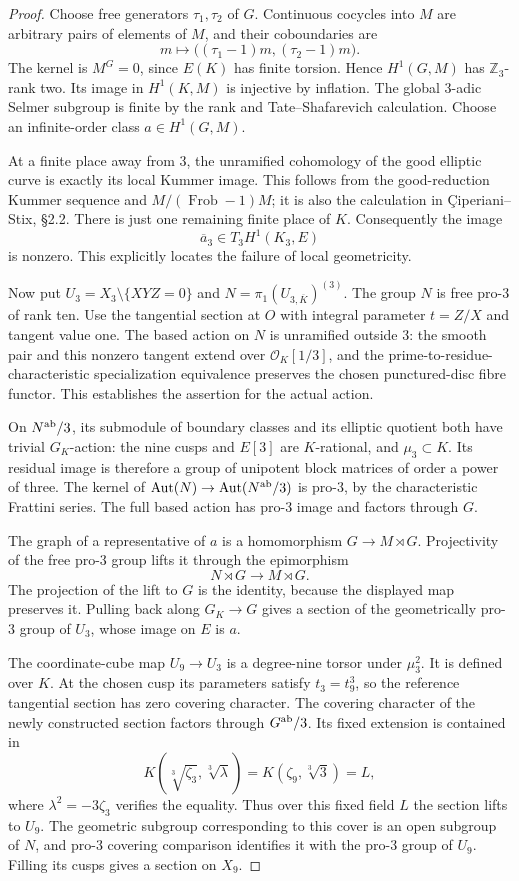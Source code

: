 \begin{proof}
Choose free generators $\tau_1,\tau_2$ of
$G$. Continuous cocycles into $M$ are
arbitrary pairs of elements of $M$,
and their coboundaries are
\[
 m\longmapsto
 \bigl((\tau_1-1)m,(\tau_2-1)m\bigr).
\]
The kernel is $M^G=0$, since $E(K)$ has
finite torsion. Hence $H^1(G,M)$ has
$\mathbb Z_3$-rank two. Its image in
$H^1(K,M)$ is injective by inflation.
The global $3$-adic Selmer subgroup is
finite by the rank and Tate--Shafarevich
calculation. Choose an infinite-order
class $a\in H^1(G,M)$.

At a finite place away from $3$, the
unramified cohomology of the good elliptic
curve is exactly its local Kummer image.
This follows from the good-reduction
Kummer sequence and
$M/(\operatorname{Frob}-1)M$; it is also
the calculation in
\c{C}iperiani--Stix, \S2.2.
There is just one remaining finite place
of $K$. Consequently the image
\[
 \overline a_3\in T_3H^1(K_3,E)
\]
is nonzero. This explicitly locates the
failure of local geometricity.

Now put $U_3=X_3\setminus\{XYZ=0\}$ and
$N=\pi_1(U_{3,\overline K})^{(3)}$.
The group $N$ is free pro-$3$ of rank ten.
Use the tangential section at $O$ with
integral parameter $t=Z/X$ and tangent
value one. The based action on $N$ is
unramified outside $3$: the smooth pair
and this nonzero tangent extend over
$\mathcal O_K[1/3]$, and the prime-to-residue-
characteristic specialization equivalence
preserves the chosen punctured-disc fibre
functor. This establishes the assertion
for the actual action.

On $N^{\rm ab}/3$, its submodule of
boundary classes and its elliptic
quotient both have trivial $G_K$-action:
the nine cusps and $E[3]$ are $K$-rational,
and $\mu_3\subset K$. Its residual image
is therefore a group of unipotent block
matrices of order a power of three.
The kernel of
$\operatorname{Aut}(N)\to
\operatorname{Aut}(N^{\rm ab}/3)$
is pro-$3$, by the characteristic
Frattini series. The full based action
has pro-$3$ image and factors through $G$.

The graph of a representative of $a$ is
a homomorphism $G\to M\rtimes G$.
Projectivity of the free pro-$3$ group
lifts it through the epimorphism
\[
 N\rtimes G\longrightarrow M\rtimes G.
\]
The projection of the lift to $G$ is
the identity, because the displayed
map preserves it. Pulling back along
$G_K\to G$ gives a section of the
geometrically pro-$3$ group of $U_3$,
whose image on $E$ is $a$.

The coordinate-cube map $U_9\to U_3$
is a degree-nine torsor under $\mu_3^2$.
It is defined over $K$. At the chosen
cusp its parameters satisfy $t_3=t_9^3$,
so the reference tangential section has
zero covering character. The covering
character of the newly constructed
section factors through
$G^{\rm ab}/3$. Its fixed extension is
contained in
\[
 K(\sqrt[3]{\zeta_3},\sqrt[3]{\lambda})
   =K(\zeta_9,\sqrt[3]{3})=L ,
\]
where $\lambda^2=-3\zeta_3$ verifies
the equality. Thus over this fixed
field $L$ the section lifts to $U_9$.
The geometric subgroup corresponding
to this cover is an open subgroup of
$N$, and pro-$3$ covering comparison
identifies it with the pro-$3$ group
of $U_9$. Filling its cusps gives a
section on $X_9$.


\end{proof}

